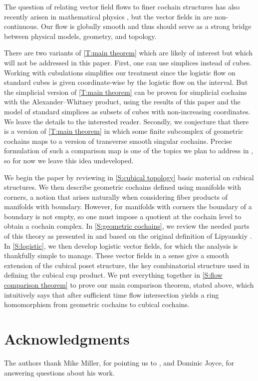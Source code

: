 The question of relating vector field flows to finer cochain structures has also recently arisen in mathematical physics \cite{Thor18, Tata20}, but the vector fields in \cite{Tata20} are non-continuous.
Our flow is globally smooth and thus should serve as a strong bridge between physical models, geometry, and topology.

There are two variants of \cref{T:main theorem} which are likely of interest but which will not be addressed in this paper.
First, one can use simplices instead of cubes.
Working with cubulations simplifies our treatment since the logistic flow on standard cubes is given coordinate-wise by the logistic flow on the interval.
But the simplicial version of \cref{T:main theorem} can be proven for simplicial cochains with the Alexander--Whitney product, using the results of this paper and the model of standard simplices as subsets of cubes with non-increasing coordinates.
We leave the details to the interested reader.
Secondly, we conjecture that there is a version of \cref{T:main theorem} in which some finite subcomplex of geometric cochains maps to a version of transverse smooth singular cochains.
Precise formulation of such a comparison map is one of the topics we plan to address in \cite{medina2022foundations}, so for now we leave this idea undeveloped.

We begin the paper by reviewing in \cref{S:cubical topology} basic material on cubical structures.
We then describe geometric cochains defined using manifolds with corners, a notion that arises naturally when considering fiber products of manifolds with boundary.
However, for manifolds with corners the boundary of a boundary is not empty, so one must impose a quotient at the cochain level to obtain a cochain complex.
In \cref{S:geometric cochains}, we review the needed parts of this theory as presented in \cite{medina2022foundations} and based on the original definition of Lipyanskiy \cite{Lipy14}.
In \cref{S:logistic}, we then develop logistic vector fields, for which the analysis is thankfully simple to manage.
These vector fields in a sense give a smooth extension of the cubical poset structure, the key combinatorial structure used in defining the cubical cup product.
We put everything together in \cref{S:flow comparison theorem} to prove our main comparison theorem, stated above, which intuitively says that after sufficient time flow intersection yields a ring homomorphism from geometric cochains to cubical cochains.

\section*{Acknowledgments}

The authors thank Mike Miller, for pointing us to \cite{Lipy14}, and Dominic Joyce, for answering questions about his work.